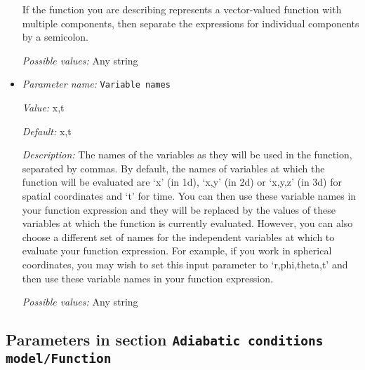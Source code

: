 \begin{itemize}
If the function you are describing represents a vector-valued function with multiple components, then separate the expressions for individual components by a semicolon.


{\it Possible values:} Any string
\item {\it Parameter name:} {\tt Variable names}
\label{parameters:Adiabatic conditions model/Compute profile/Surface condition function/Variable names}
\label{parameters:Adiabatic_20conditions_20model/Compute_20profile/Surface_20condition_20function/Variable_20names}


{\it Value:} x,t


{\it Default:} x,t


{\it Description:} The names of the variables as they will be used in the function, separated by commas. By default, the names of variables at which the function will be evaluated are `x' (in 1d), `x,y' (in 2d) or `x,y,z' (in 3d) for spatial coordinates and `t' for time. You can then use these variable names in your function expression and they will be replaced by the values of these variables at which the function is currently evaluated. However, you can also choose a different set of names for the independent variables at which to evaluate your function expression. For example, if you work in spherical coordinates, you may wish to set this input parameter to `r,phi,theta,t' and then use these variable names in your function expression.


{\it Possible values:} Any string
\end{itemize}

\subsection{Parameters in section \tt Adiabatic conditions model/Function}
\label{parameters:Adiabatic_20conditions_20model/Function}

